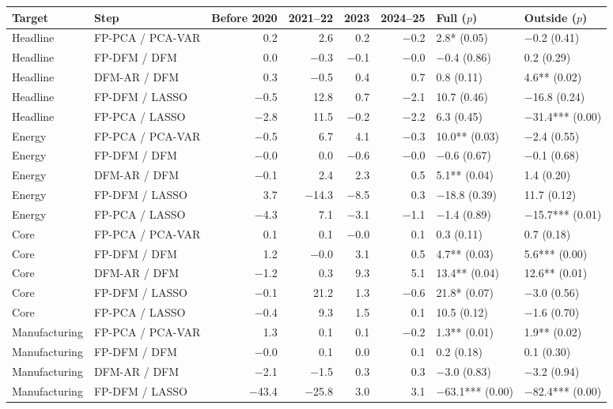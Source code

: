 \begin{threeparttable}
\begin{tabular}{llrrrrll}
\toprule
Target & Step & Before 2020 & 2021--22 & 2023 & 2024--25 & Full ($p$) & Outside ($p$) \\
\midrule
Headline & FP-PCA / PCA-VAR & 0.2 & 2.6 & 0.2 & $-$0.2 & 2.8* (0.05) & $-$0.2 (0.41) \\
Headline & FP-DFM / DFM & 0.0 & $-$0.3 & $-$0.1 & $-$0.0 & $-$0.4 (0.86) & 0.2 (0.29) \\
Headline & DFM-AR / DFM & 0.3 & $-$0.5 & 0.4 & 0.7 & 0.8 (0.11) & 4.6** (0.02) \\
Headline & FP-DFM / LASSO & $-$0.5 & 12.8 & 0.7 & $-$2.1 & 10.7 (0.46) & $-$16.8 (0.24) \\
Headline & FP-PCA / LASSO & $-$2.8 & 11.5 & $-$0.2 & $-$2.2 & 6.3 (0.45) & $-$31.4*** (0.00) \\
\midrule
Energy & FP-PCA / PCA-VAR & $-$0.5 & 6.7 & 4.1 & $-$0.3 & 10.0** (0.03) & $-$2.4 (0.55) \\
Energy & FP-DFM / DFM & $-$0.0 & 0.0 & $-$0.6 & $-$0.0 & $-$0.6 (0.67) & $-$0.1 (0.68) \\
Energy & DFM-AR / DFM & $-$0.1 & 2.4 & 2.3 & 0.5 & 5.1** (0.04) & 1.4 (0.20) \\
Energy & FP-DFM / LASSO & 3.7 & $-$14.3 & $-$8.5 & 0.3 & $-$18.8 (0.39) & 11.7 (0.12) \\
Energy & FP-PCA / LASSO & $-$4.3 & 7.1 & $-$3.1 & $-$1.1 & $-$1.4 (0.89) & $-$15.7*** (0.01) \\
\midrule
Core & FP-PCA / PCA-VAR & 0.1 & 0.1 & $-$0.0 & 0.1 & 0.3 (0.11) & 0.7 (0.18) \\
Core & FP-DFM / DFM & 1.2 & $-$0.0 & 3.1 & 0.5 & 4.7** (0.03) & 5.6*** (0.00) \\
Core & DFM-AR / DFM & $-$1.2 & 0.3 & 9.3 & 5.1 & 13.4** (0.04) & 12.6** (0.01) \\
Core & FP-DFM / LASSO & $-$0.1 & 21.2 & 1.3 & $-$0.6 & 21.8* (0.07) & $-$3.0 (0.56) \\
Core & FP-PCA / LASSO & $-$0.4 & 9.3 & 1.5 & 0.1 & 10.5 (0.12) & $-$1.6 (0.70) \\
\midrule
Manufacturing & FP-PCA / PCA-VAR & 1.3 & 0.1 & 0.1 & $-$0.2 & 1.3** (0.01) & 1.9** (0.02) \\
Manufacturing & FP-DFM / DFM & $-$0.0 & 0.1 & 0.0 & 0.1 & 0.2 (0.18) & 0.1 (0.30) \\
Manufacturing & DFM-AR / DFM & $-$2.1 & $-$1.5 & 0.3 & 0.3 & $-$3.0 (0.83) & $-$3.2 (0.94) \\
Manufacturing & FP-DFM / LASSO & $-$43.4 & $-$25.8 & 3.0 & 3.1 & $-$63.1*** (0.00) & $-$82.4*** (0.00) \\

\end{tabular}
\end{threeparttable}
